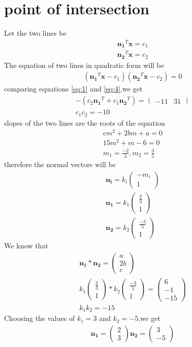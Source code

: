 \documentclass[journal,12pt,twocolumn]{IEEEtran}
\providecommand{\brak}[1]{\ensuremath{\left(#1\right)}}
\newcommand{\myvec}[1]{\ensuremath{\begin{pmatrix}#1\end{pmatrix}}}
\numberwithin{equation}{subsection}
\let\vec\mathbf
\begin{document}
\section{point of intersection}
Let the two lines be
\begin{align}
    \vec{n_1}^T\vec{x}=c_1\\
    \vec{n_2}^T\vec{x}=c_2
\end{align}
The equation of two lines in quadratic form will be
\begin{align}
    \brak{\vec{n_1}^T\vec{x}-c_1}\brak{\vec{n_2}^T\vec{x}-c_2}=0\label{eq:4}
\end{align}
comparing equations \eqref{eq:1} and \eqref{eq:4},we get
\begin{align}
    -\brak{c_2\vec{n_1}^T+c_1\vec{n_2}^T}=\myvec{-11& 31}\label{eq:4.1}\\
    c_1c_2=-10\label{eq:4.2}
\end{align}
slopes of the two lines are the roots of the equation
\begin{align}
    cm^2+2bm+a=0\\
    15m^2+m-6=0\\
    m_1=\frac{-2}{3},m_2=\frac{3}{5}
\end{align}
therefore the normal vectors will be
\begin{align}
    \vec{n_i}=k_i\myvec{-m_i\\1}\\
    \vec{n_1}=k_1\myvec{\frac{2}{3}\\1}\\
    \vec{n_2}=k_2\myvec{\frac{-3}{5}\\1}
\end{align}
We know that
\begin{align}
    \vec{n_1}\ast \vec{n_2}=\myvec{a\\2b\\c}\\
    k_1\myvec{\frac{2}{3}\\1}\ast k_2\myvec{\frac{-3}{5}\\1}=\myvec{6\\-1\\-15}\\
    k_1k_2=-15
\end{align}
Choosing the values of $k_1=3$ and $k_2=-5$,we get
\begin{align}
    \vec{n_1}=\myvec{2\\3}
    \vec{n_2}=\myvec{3\\-5}
\end{align}
\end{document}

